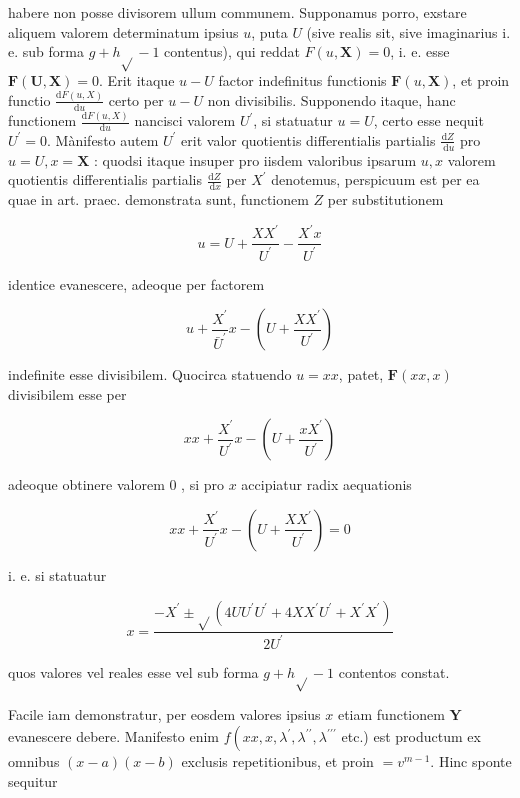 \documentclass[10pt]{article}
\begin{document}
habere non posse divisorem ullum communem. Supponamus porro, exstare aliquem valorem determinatum ipsius \(u\), puta \(U\) (sive realis sit, sive imaginarius i. e. sub forma \(g+h \sqrt{ }-1\) contentus), qui reddat \(F(u, \boldsymbol{X})=0\), i. e. esse \(\boldsymbol{F}(\boldsymbol{U}, \boldsymbol{X})=0\). Erit itaque \(u-U\) factor indefinitus functionis \(\boldsymbol{F}(u, \boldsymbol{X})\), et proin functio \(\frac{\mathrm{d} F(u, X)}{\mathrm{d} u}\) certo per \(u-U\) non divisibilis. Supponendo itaque, hanc functionem
\(\frac{\mathrm{d} F(u, X)}{\mathrm{d} u}\) nancisci valorem \(U^{\prime}\), si statuatur \(u=U\), certo esse nequit \(U^{\prime}=0\). Mànifesto autem \(U^{\prime}\) erit valor quotientis differentialis partialis \(\frac{\mathrm{d} Z}{\mathrm{~d} u}\) pro \(u=U, x=\boldsymbol{X}\) : quodsi itaque insuper pro iisdem valoribus ipsarum \(u, x\) valorem quotientis differentialis partialis \(\frac{\mathrm{d} Z}{\mathrm{~d} x}\) per \(X^{\prime}\) denotemus, perspicuum est per ea quae in art. praec. demonstrata sunt, functionem \(Z\) per substitutionem

\[
u=U+\frac{X X^{\prime}}{U^{\prime}}-\frac{X^{\prime} x}{U^{\prime}}
\]

identice evanescere, adeoque per factorem

\[
u+\frac{X^{\prime}}{\bar{U}^{\prime}} x-\left(U+\frac{X X^{\prime}}{U^{\prime}}\right)
\]

indefinite esse divisibilem. Quocirca statuendo \(u=x x\), patet, \(\boldsymbol{F}(x x, x)\) divisibilem esse per

\[
x x+\frac{X^{\prime}}{U^{\prime}} x-\left(U+\frac{x X^{\prime}}{U^{\prime}}\right)
\]

adeoque obtinere valorem 0 , si pro \(x\) accipiatur radix aequationis

\[
x x+\frac{X^{\prime}}{U^{\prime}} x-\left(U+\frac{X X^{\prime}}{U^{\prime}}\right)=0
\]

i. e. si statuatur

\[
x=\frac{-X^{\prime} \pm \sqrt{ }\left(4 U U^{\prime} U^{\prime}+4 X X^{\prime} U^{\prime}+X^{\prime} X^{\prime}\right)}{2 U^{\prime}}
\]

quos valores vel reales esse vel sub forma \(g+h \sqrt{ }-1\) contentos constat.

Facile iam demonstratur, per eosdem valores ipsius \(x\) etiam functionem \(\boldsymbol{Y}\) evanescere debere. Manifesto enim \(f\left(x x, x, \lambda^{\prime}, \lambda^{\prime \prime}, \lambda^{\prime \prime \prime}\right.\) etc.) est productum ex omnibus \((x-a)(x-b)\) exclusis repetitionibus, et proin \(=v^{m-1}\). Hinc sponte sequitur
\end{document}
